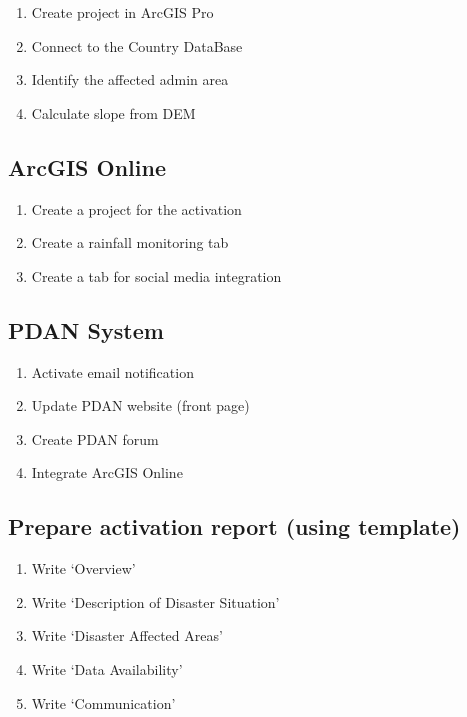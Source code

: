\documentclass[]{book}
\providecommand{\tightlist}{%
  \setlength{\itemsep}{0pt}\setlength{\parskip}{0pt}}
\begin{document}
\begin{enumerate}
\def\labelenumi{\arabic{enumi}.}
\tightlist
\item
  Create project in ArcGIS Pro
\item
  Connect to the Country DataBase
\item
  Identify the affected admin area
\item
  Calculate slope from DEM
\end{enumerate}

\subsection{ArcGIS Online}\label{arcgis-online}

\begin{enumerate}
\def\labelenumi{\arabic{enumi}.}
\tightlist
\item
  Create a project for the activation
\item
  Create a rainfall monitoring tab
\item
  Create a tab for social media integration
\end{enumerate}

\subsection{PDAN System}\label{pdan-system}

\begin{enumerate}
\def\labelenumi{\arabic{enumi}.}
\tightlist
\item
  Activate email notification
\item
  Update PDAN website (front page)
\item
  Create PDAN forum
\item
  Integrate ArcGIS Online
\end{enumerate}

\subsection{Prepare activation report (using
template)}\label{prepare-activation-report-using-template}

\begin{enumerate}
\def\labelenumi{\arabic{enumi}.}
\tightlist
\item
  Write `Overview'
\item
  Write `Description of Disaster Situation'
\item
  Write `Disaster Affected Areas'
\item
  Write `Data Availability'
\item
  Write `Communication'
\end{enumerate}
\end{document}
